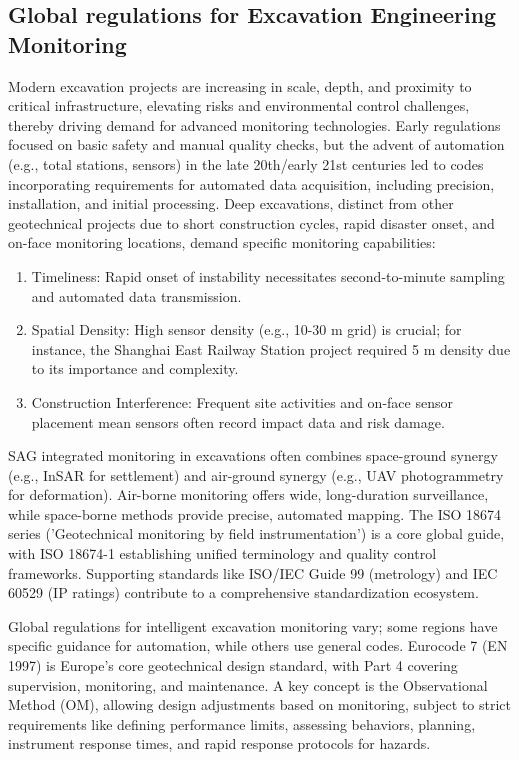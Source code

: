 \documentclass[preprint,11pt,authoryear,3p]{elsarticle}
\begin{document}
\subsection{Global regulations for Excavation Engineering Monitoring}

Modern excavation projects are increasing in scale, depth, and proximity to critical infrastructure, elevating risks and environmental control challenges, thereby driving demand for advanced monitoring technologies. Early regulations focused on basic safety and manual quality checks, but the advent of automation (e.g., total stations, sensors) in the late 20th/early 21st centuries led to codes incorporating requirements for automated data acquisition, including precision, installation, and initial processing. Deep excavations, distinct from other geotechnical projects due to short construction cycles, rapid disaster onset, and on-face monitoring locations, demand specific monitoring capabilities:

\begin{enumerate}
    \item Timeliness: Rapid onset of instability necessitates second-to-minute sampling and automated data transmission.
    \item Spatial Density: High sensor density (e.g., 10-30 m grid) is crucial; for instance, the Shanghai East Railway Station project required 5 m density due to its importance and complexity.
    \item Construction Interference: Frequent site activities and on-face sensor placement mean sensors often record impact data and risk damage.
\end{enumerate}

SAG integrated monitoring in excavations often combines space-ground synergy (e.g., InSAR for settlement) and air-ground synergy (e.g., UAV photogrammetry for deformation). Air-borne monitoring offers wide, long-duration surveillance, while space-borne methods provide precise, automated mapping. The ISO 18674 series ('Geotechnical monitoring by field instrumentation') \citep{ISO18674-1:2015,ISO18674-2:2016,ISO18674-3:2017} is a core global guide, with ISO 18674-1 establishing unified terminology and quality control frameworks. Supporting standards like ISO/IEC Guide 99 \citep{JCGM200:2012} (metrology) and IEC 60529 \citep{IEC60529:2013} (IP ratings) contribute to a comprehensive standardization ecosystem.

Global regulations for intelligent excavation monitoring vary; some regions have specific guidance for automation, while others use general codes. Eurocode 7 (EN 1997) \citep{EN1997-1:2024} is Europe's core geotechnical design standard, with Part 4 covering supervision, monitoring, and maintenance. A key concept is the Observational Method (OM), allowing design adjustments based on monitoring, subject to strict requirements like defining performance limits, assessing behaviors, planning, instrument response times, and rapid response protocols for hazards.
\end{document}

